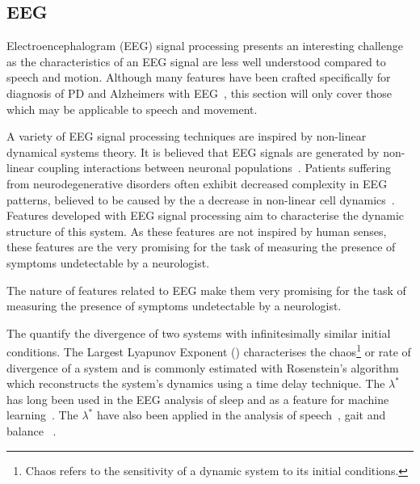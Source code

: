 \documentclass[12pt, twoside]{book}
\renewcommand\emph[1]{\textit{\color{USred}{#1}}}
\begin{document}
\subsection{EEG}
\label{eegsigproc}
Electroencephalogram (EEG) signal processing presents an interesting challenge as the characteristics of an EEG signal are less well understood compared to speech and motion. Although many features have been crafted specifically for diagnosis of PD and Alzheimers with EEG~\cite{eegnonlinearpd, eegalzheimers}, this section will only cover those which may be applicable to speech and movement.

A variety of EEG signal processing techniques are inspired by non-linear dynamical systems theory. It is believed that EEG signals are generated by non-linear coupling interactions between neuronal populations~\cite{eegalzheimers}. Patients suffering from neurodegenerative disorders often exhibit decreased complexity in EEG patterns, believed to be caused by the a decrease in  non-linear cell dynamics~\cite{jelles1999decrease}. Features developed with EEG signal processing aim to characterise the dynamic structure of this system. As these features are not inspired by human senses, these features are the very promising for the task of measuring the presence of symptoms undetectable by a neurologist. 

\begin{highlight}
The nature of features related to EEG make them very promising for the task of measuring the presence of symptoms undetectable by a neurologist.
\end{highlight}

The \emph{Lyapunov Exponents} quantify the divergence of two systems with infinitesimally similar initial conditions. The Largest Lyapunov Exponent (\emph{$\lambda^*$}) characterises the chaos\footnote{Chaos refers to the sensitivity of a dynamic system to its initial conditions.} or rate of divergence of a system and is commonly estimated with Rosenstein's algorithm~\cite{rosenstein1993practicallyapunov} which reconstructs the system's dynamics using a time delay technique. The $\lambda^*$ has long been used in the EEG analysis of sleep and as a feature for machine learning~\cite{eeglyapunov1, eeglyapunov2}. The $\lambda^*$ have also been applied in the analysis of speech~\cite{banbrook1999speechlyapunov,kokkinos2005nonlinearlyapunov}, gait and balance ~\cite{dingwell2000nonlinearlyapunov, howcroft2014analysisgaitlyapunov, liu2015analysislyapunov}.

\end{document}
